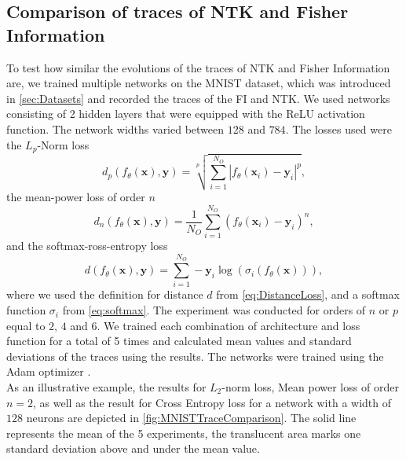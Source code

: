 \subsection{Comparison of traces of NTK and Fisher Information}\label{sec:TraceComparisonExperiment}
To test how similar the evolutions of the traces of NTK and Fisher Information are, we trained multiple networks on the MNIST dataset, which was introduced in \cref{sec:Datasets} and recorded the traces of the FI and NTK. We used networks consisting of 2 hidden layers that were equipped with the ReLU activation function. The network widths varied between $128$ and $784$. The losses used were the $L_p$-Norm loss \cite{LpNormSource}
\begin{equation}
	d_p(f_\theta(\mathbf{x}),\mathbf{y}) = \sqrt[p]{\sum_{i=1}^{N_O} |f_\theta(\mathbf{x}_i) - \mathbf{y}_i|^p},
\end{equation}
the mean-power loss of order $n$
\begin{equation}
	d_n(f_\theta(\mathbf{x}),\mathbf{y}) = \frac{1}{N_O} \sum_{i=1}^{N_O} (f_\theta(\mathbf{x}_i)-\mathbf{y}_i)^n,
\end{equation}
and the softmax-ross-entropy loss \cite{LossExamplePaper}
\begin{equation}
	d(f_\theta(\mathbf{x}),\mathbf{y}) = \sum_{i=1}^{N_O} -\mathbf{y}_i \log(\sigma_i(f_\theta(\mathbf{x}))),
\end{equation}
where we used the definition for distance $d$ from \cref{eq:DistanceLoss}, and a softmax function $\sigma_i$ from \cref{eq:softmax}. The experiment was conducted for orders of $n$ or $p$ equal to $2$, $4$ and $6$. We trained each combination of architecture and loss function for a total of 5 times and calculated mean values and standard deviations of the traces using the results. The networks were trained using the Adam optimizer \cite{adamPaper}.\\
As an illustrative example, the results for $L_2$-norm loss, Mean power loss of order $n=2$, as well as the result for Cross Entropy loss for a network with a width of $128$ neurons are depicted in \cref{fig:MNISTTraceComparison}. The solid line represents the mean of the 5 experiments, the translucent area marks one standard deviation above and under the mean value.\\

